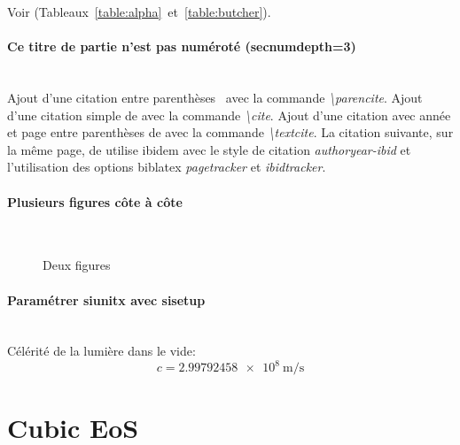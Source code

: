 			Voir (Tableaux~\ref{table:alpha}~et~\ref{table:butcher}).

			\paragraph{Ce titre de partie n'est pas numéroté (secnumdepth=3)}~~\\ %

				Ajout d'une citation entre parenthèses~\parencite{godard_borreliose_2012} avec la commande \textit{\textbackslash parencite}. Ajout d'une citation simple de \cite{zohdy_mapping_2012} avec la commande \textit{\textbackslash cite}. Ajout d'une citation avec année et page entre parenthèses de \textcite[9]{godard_borreliose_2012} avec la commande \textit{\textbackslash textcite}. La citation suivante, sur la même page, de \textcite[12]{godard_borreliose_2012} utilise ibidem avec le style de citation \textit{authoryear-ibid} et l'utilisation des options biblatex \textit{pagetracker} et \textit{ibidtracker}.

			\paragraph{Plusieurs figures côte à côte}~~\\

				\lipsum[66]


				\begin{figure}
					\centering
					\caption{Deux figures}
					\label{fig:deux_figures}
				\end{figure}

			\paragraph{Paramétrer siunitx avec sisetup}~~\\
			
        		Célérité de la lumière dans le vide: $$c=\SI{2.99792458e8}{\meter\per\second}$$
\section{Cubic EoS}
